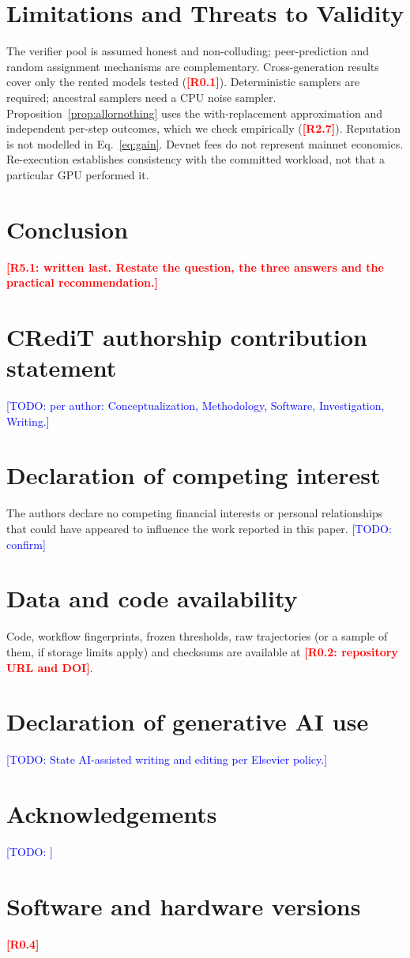 \documentclass[preprint,review,12pt,authoryear]{elsarticle}
\newcommand{\res}[1]{\textcolor{red}{\textbf{[#1]}}}          %
\newcommand{\todo}[1]{\textcolor{blue}{[TODO: #1]}}            %
\theoremstyle{definition}
\begin{document}
\section{Limitations and Threats to Validity}\label{sec:limits}
The verifier pool is assumed honest and non-colluding; peer-prediction and random assignment mechanisms \citep{verifierdilemma2024} are complementary. Cross-generation results cover only the rented models tested (\res{R0.1}). Deterministic samplers are required; ancestral samplers need a CPU noise sampler. Proposition~\ref{prop:allornothing} uses the with-replacement approximation and independent per-step outcomes, which we check empirically (\res{R2.7}). Reputation is not modelled in Eq.~\eqref{eq:gain}. Devnet fees do not represent mainnet economics. Re-execution establishes consistency with the committed workload, not that a particular GPU performed it.

\section{Conclusion}\label{sec:conclusion}
\res{R5.1: written last. Restate the question, the three answers and the practical recommendation.}

\section*{CRediT authorship contribution statement}
\todo{per author: Conceptualization, Methodology, Software, Investigation, Writing.}

\section*{Declaration of competing interest}
The authors declare no competing financial interests or personal relationships that could have appeared to influence the work reported in this paper. \todo{confirm}

\section*{Data and code availability}
Code, workflow fingerprints, frozen thresholds, raw trajectories (or a sample of them, if storage limits apply) and checksums are available at \res{R0.2: repository URL and DOI}.

\section*{Declaration of generative AI use}
\todo{State AI-assisted writing and editing per Elsevier policy.}

\section*{Acknowledgements}
\todo{}

\appendix
\section{Software and hardware versions}\label{app:versions}
\res{R0.4}



\end{document}
